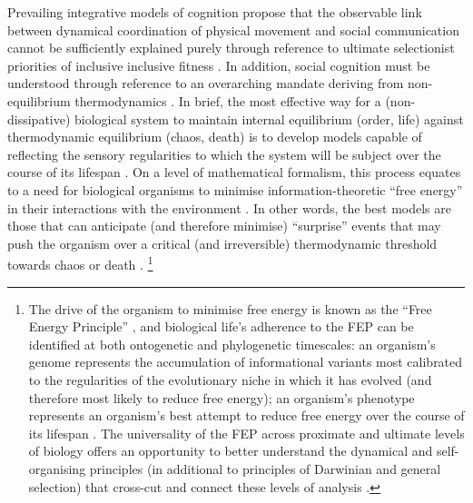 \begin{CJK}{UTF8}{gbsn}

Prevailing integrative models of cognition propose that the observable link between dynamical coordination of physical movement and social communication cannot be sufficiently explained purely through reference to ultimate selectionist priorities of inclusive inclusive fitness \cite{Badcock2012}.  In addition, social cognition must be understood through reference to an overarching mandate deriving from non-equilibrium thermodynamics \citep{Schrodinger1944}.  In brief, the most effective way for a (non-dissipative) biological system to maintain internal equilibrium (order, life) against thermodynamic equilibrium (chaos, death) is to develop models capable of reflecting the sensory regularities to which the system will be subject over the course of its lifespan \citep{Conant1970,Yufik2016}. On a level of mathematical formalism, this process equates to a need for biological organisms to minimise information-theoretic ``free energy'' in their interactions with the environment \citep{Friston2006,Ramstead2017,Yufik2017}.  In other words, the best models are those that can anticipate (and therefore minimise) ``surprise'' events that may push the organism over a critical (and irreversible) thermodynamic threshold towards chaos or death \citep[here surprise can be understood as a rough equivalent of free energy, see][]{Friston2013}.
  \footnote{The drive of the organism to minimise free energy is known as the ``Free Energy Principle'' \citep[hereafter FEP; see][]{Friston2010}, and biological life's adherence to the FEP can be identified at both ontogenetic and phylogenetic timescales: an organism's genome represents the accumulation of informational variants most calibrated to the regularities of the evolutionary niche in which it has evolved (and therefore most likely to reduce free energy); an organism's phenotype represents an organism's best attempt to reduce free energy over the course of its lifespan \citep{Ramstead2017}.  The universality of the FEP across proximate and ultimate levels of biology offers an opportunity to better understand the dynamical and self-organising principles (in additional to principles of Darwinian and general selection) that cross-cut and connect these levels of analysis \citep{Caporael2001,Badcock2012,Laland2015,Ramstead2017}.}


\end{CJK}
